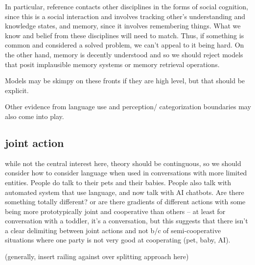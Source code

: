 \documentclass[]{article}
\begin{document}
In particular, reference contacts other disciplines in the forms of social cognition, since this is a social interaction and involves tracking other's understanding and knowledge states, and memory, since it involves remembering things. What we know and belief from these disciplines will need to match. Thus, if something is common and considered a solved problem, we can't appeal to it being hard. On the other hand, memory is decently understood and so we should reject models that posit implausible memory systems or memory retrieval operations. 

Models may be skimpy on these fronts if they are high level, but that should be explicit. 

Other evidence from language use and perception/ categorization boundaries may also come into play. 

\subsection{joint action}
\cite{clark1996} while not the central interest here, theory should be continguous, so we should consider how to consider language when used in conversations with more limited entities. People do talk to their pets and their babies. People also talk with automated system that use language, and now talk with AI chatbots. Are there something totally different? or are there gradients of different actions with some being more prototypically joint and cooperative than others -- at least for conversation with a toddler, it's a conversation, but this suggests that there isn't a clear delimiting between joint actions and not b/c of semi-cooperative situations where one party is not very good at cooperating (pet, baby, AI). 

(generally, insert railing against over splitting approach here)
\end{document}
